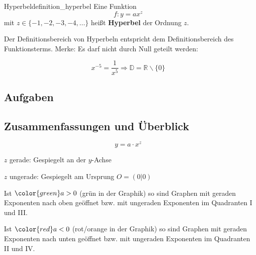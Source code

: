 \begin{definition}{Hyperbel}{definition_hyperbel}
  Eine Funktion $$f: y=ax^z$$
  mit $z \in \{-1, -2, -3, -4, ...\}$ heißt
\textbf{Hyperbel} der Ordnung $z$.
\end{definition}

Der Definitionsbereich von Hyperbeln entspricht dem Definitionsbereich
des Funktionsterms. Merke: Es darf nicht durch Null geteilt werden:

$$x^{-5} = \frac{1}{x^5} \Longrightarrow \mathbb{D} = \mathbb{R} \backslash \{0\}$$


\subsection*{Aufgaben}


\newpage
\subsection{Zusammenfassungen und
  Überblick}

$$y = a\cdot{}x^z$$

$z$ gerade: Gespiegelt an der $y$-Achse

$z$ ungerade: Gespiegelt am Ursprung $O=(0|0)$

Ist ${\color{green}a>0}$ (grün in der Graphik) so sind Graphen mit
geraden Exponenten nach oben geöffnet bzw. mit ungeraden Exponenten im
Quadranten I und III.

Ist ${\color{red}a<0}$ (rot/orange in der Graphik) so sind Graphen mit
geraden Exponenten nach unten geöffnet bzw. mit ungeraden Exponenten
im Quadranten II und IV.

